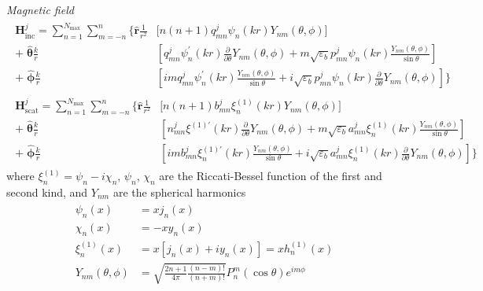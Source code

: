 \documentclass[11pt]{article}
\begin{document}
\textit{Magnetic field}
\begin{align}
\begin{split}
    \boldsymbol{H}_\text{inc}^j = \sum_{n=1}^{N_\text{max}} \sum_{m=-n}^{n} \bigg\{
    \boldsymbol{\hat r}\frac{1}{r^2} &\bigg[ n(n+1) q_{mn}^j \psi_n(kr) Y_{nm}(\theta,\phi) \bigg] \\
    +\; \boldsymbol{\hat \theta}\frac{k}{r} &\left[ q_{mn}^j \psi_n^\prime(kr) \frac{\partial}{\partial \theta} Y_{nm}(\theta,\phi)
    + m\sqrt{\varepsilon_b} p_{mn}^j \psi_n(kr) \frac{Y_{nm}(\theta,\phi)}{\sin\theta} \right] \\
    +\; \boldsymbol{\hat \phi}\frac{k}{r} &\left[ im q_{mn}^j \psi_n^\prime(kr) \frac{Y_{nm}(\theta,\phi)}{\sin\theta}
    + i\sqrt{\varepsilon_b} p_{mn}^j \psi_n(kr) \frac{\partial}{\partial \theta} Y_{nm}(\theta,\phi) \right] \bigg\}
\end{split}
\end{align}
\begin{align}
\begin{split}
    \boldsymbol{H}_\text{scat}^j = \sum_{n=1}^{N_\text{max}} \sum_{m=-n}^{n} \bigg\{
    \boldsymbol{\hat r}\frac{1}{r^2} &\bigg[ n(n+1) b_{mn}^j \xi_n^{(1)}(kr) Y_{nm}(\theta,\phi) \bigg] \\
    +\; \boldsymbol{\hat \theta}\frac{k}{r} &\left[ n_{mn}^j \xi^{(1)\prime}(kr) \frac{\partial}{\partial \theta} Y_{nm}(\theta,\phi)
    + m\sqrt{\varepsilon_b} a_{mn}^j \xi_n^{(1)}(kr) \frac{Y_{nm}(\theta,\phi)}{\sin\theta} \right] \\
    +\; \boldsymbol{\hat \phi}\frac{k}{r} &\left[ im b_{mn}^j \xi_n^{(1)\prime}(kr) \frac{Y_{nm}(\theta,\phi)}{\sin\theta}
    + i\sqrt{\varepsilon_b} a_{mn}^j \xi_n^{(1)}(kr) \frac{\partial}{\partial \theta} Y_{nm}(\theta,\phi) \right] \bigg\}
\end{split}
\end{align}
where $\xi_n^{(1)} = \psi_n - i \chi_n$, $\psi_n$, $\chi_n$ are the Riccati-Bessel function of the first and second kind, and $Y_{nm}$ are the spherical harmonics
\begin{align}
\begin{split}
    \psi_n(x) &= xj_n(x) \\
    \chi_n(x) &= -xy_n(x) \\
    \xi_n^{(1)}(x) &= x[j_n(x) + iy_n(x)] = xh_n^{(1)}(x) \\
    Y_{nm}(\theta, \phi) &= \sqrt{\frac{2n+1}{4\pi}\frac{(n-m)!}{(n+m)!}} P_n^m(\cos \theta) e^{im\phi}
\end{split}
\end{align}
\end{document}

